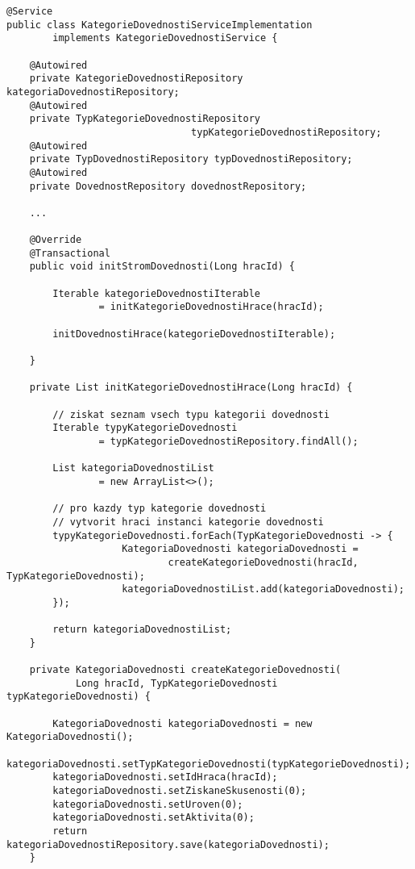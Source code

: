 \documentclass[12pt]{article}
\begin{document}
\begin{lstlisting}
@Service
public class KategorieDovednostiServiceImplementation 
        implements KategorieDovednostiService {
        
    @Autowired
    private KategorieDovednostiRepository kategoriaDovednostiRepository;
    @Autowired
    private TypKategorieDovednostiRepository 
                                typKategorieDovednostiRepository;
    @Autowired
    private TypDovednostiRepository typDovednostiRepository;
    @Autowired
    private DovednostRepository dovednostRepository;
    
    ...
    
    @Override
    @Transactional
    public void initStromDovednosti(Long hracId) {
        
        Iterable kategorieDovednostiIterable
                = initKategorieDovednostiHrace(hracId);

        initDovednostiHrace(kategorieDovednostiIterable);

    }
    
    private List initKategorieDovednostiHrace(Long hracId) {

        // ziskat seznam vsech typu kategorii dovednosti
        Iterable typyKategorieDovednosti
                = typKategorieDovednostiRepository.findAll();
    
        List kategoriaDovednostiList
                = new ArrayList<>();
    
        // pro kazdy typ kategorie dovednosti
        // vytvorit hraci instanci kategorie dovednosti
        typyKategorieDovednosti.forEach(TypKategorieDovednosti -> {
                    KategoriaDovednosti kategoriaDovednosti =
                            createKategorieDovednosti(hracId, TypKategorieDovednosti);
                    kategoriaDovednostiList.add(kategoriaDovednosti);
        });

        return kategoriaDovednostiList;
    }
    
    private KategoriaDovednosti createKategorieDovednosti(
            Long hracId, TypKategorieDovednosti typKategorieDovednosti) {

        KategoriaDovednosti kategoriaDovednosti = new KategoriaDovednosti();
        kategoriaDovednosti.setTypKategorieDovednosti(typKategorieDovednosti);
        kategoriaDovednosti.setIdHraca(hracId);
        kategoriaDovednosti.setZiskaneSkusenosti(0);
        kategoriaDovednosti.setUroven(0);
        kategoriaDovednosti.setAktivita(0);
        return kategoriaDovednostiRepository.save(kategoriaDovednosti);
    }
    

\end{lstlisting}
\end{document}
